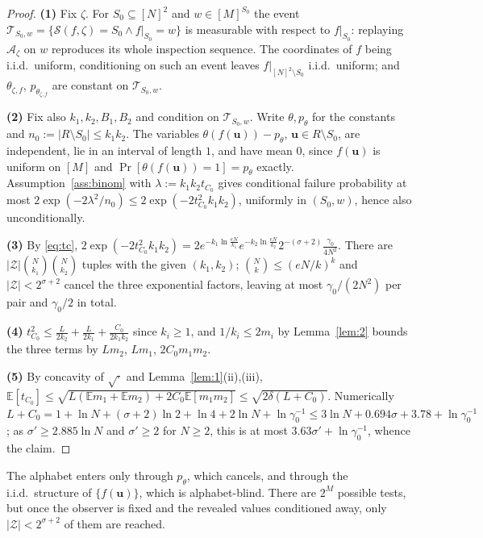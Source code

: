 \documentclass{aicr-solution}
\newcommand{\Prob}[1]{\Pr\!\left[#1\right]}
\newcommand{\Exp}{\mathbb{E}}
\newcommand{\vu}{\mathbf{u}}
\begin{document}
\begin{proof}
\textbf{(1)} Fix $\zeta$. For $S_0 \subseteq [N]^{2}$ and $w \in [M]^{S_0}$ the
event $\mathcal{T}_{S_0,w} = \{\mathcal{S}(f,\zeta) = S_0 \wedge f|_{S_0} = w\}$ is
measurable with respect to $f|_{S_0}$: replaying $\mathcal{A}_\zeta$ on $w$
reproduces its whole inspection sequence. The coordinates of $f$ being i.i.d.\
uniform, conditioning on such an event leaves
$f|_{[N]^{2} \setminus S_0}$ i.i.d.\ uniform; and $\theta_{\zeta,f}$,
$p_{\theta_{\zeta,f}}$ are constant on $\mathcal{T}_{S_0,w}$.

\textbf{(2)} Fix also $k_1,k_2,B_1,B_2$ and condition on $\mathcal{T}_{S_0,w}$.
Write $\theta, p_\theta$ for the constants and
$n_0 := |R \setminus S_0| \le k_1k_2$. The variables
$\theta(f(\vu)) - p_\theta$, $\vu \in R \setminus S_0$, are independent, lie in an
interval of length $1$, and have mean $0$, since $f(\vu)$ is uniform on $[M]$ and
$\Prob{\theta(f(\vu)) = 1} = p_\theta$ exactly. Assumption~\ref{ass:binom} with
$\lambda := k_1k_2 t_{C_0}$ gives conditional failure probability at most
$2\exp(-2\lambda^{2}/n_0) \le 2\exp(-2t_{C_0}^{2}k_1k_2)$, uniformly in
$(S_0,w)$, hence also unconditionally.

\textbf{(3)} By \eqref{eq:tc},
$2\exp(-2t_{C_0}^{2}k_1k_2)
= 2 e^{-k_1 \ln\frac{eN}{k_1}} e^{-k_2 \ln\frac{eN}{k_2}} 2^{-(\sigma+2)}
\frac{\gamma_0}{4N^{2}}$. There are
$|\mathcal{Z}|\binom{N}{k_1}\binom{N}{k_2}$ tuples with the given $(k_1,k_2)$;
$\binom{N}{k} \le (eN/k)^{k}$ and $|\mathcal{Z}| < 2^{\sigma+2}$ cancel the three
exponential factors, leaving at most $\gamma_0/(2N^{2})$ per pair and $\gamma_0/2$
in total.

\textbf{(4)} $t_{C_0}^{2} \le \frac{L}{2k_2} + \frac{L}{2k_1}
+ \frac{C_0}{2k_1k_2}$ since $k_i \ge 1$, and $1/k_i \le 2m_i$ by
Lemma~\ref{lem:2} bounds the three terms by $Lm_2$, $Lm_1$, $2C_0m_1m_2$.

\textbf{(5)} By concavity of $\sqrt{\cdot}$ and Lemma~\ref{lem:1}(ii),(iii),
$\Exp[t_{C_0}] \le \sqrt{L(\Exp m_1 + \Exp m_2) + 2C_0\Exp[m_1m_2]}
\le \sqrt{2\delta(L+C_0)}$. Numerically
$L + C_0 = 1 + \ln N + (\sigma+2)\ln 2 + \ln 4 + 2\ln N + \ln\gamma_0^{-1}
\le 3\ln N + 0.694\sigma + 3.78 + \ln\gamma_0^{-1}$; as
$\sigma' \ge 2.885 \ln N$ and $\sigma' \ge 2$ for $N \ge 2$, this is at most
$3.63\sigma' + \ln\gamma_0^{-1}$, whence the claim.
\end{proof}

\begin{remark}
The alphabet enters only through $p_\theta$, which cancels, and through the
i.i.d.\ structure of $\{f(\vu)\}$, which is alphabet-blind. There are $2^{M}$
possible tests, but once the observer is fixed and the revealed values conditioned
away, only $|\mathcal{Z}| < 2^{\sigma+2}$ of them are reached.
\end{remark}
\end{document}
